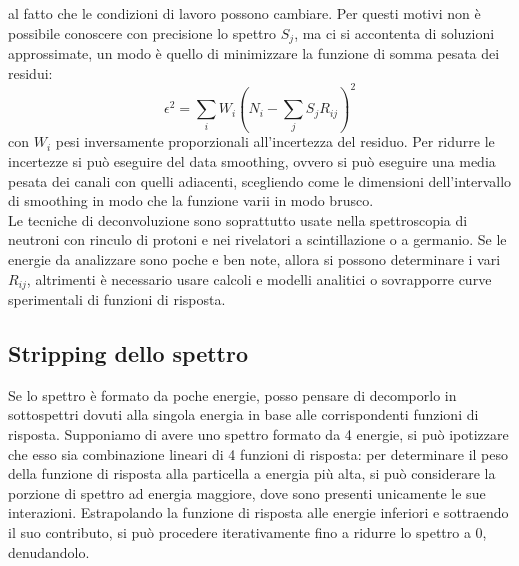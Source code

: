 al fatto che le condizioni di lavoro possono cambiare.
Per questi motivi non \`e possibile conoscere con precisione lo spettro $S_j$, ma ci si accontenta di soluzioni approssimate,
un modo \`e quello di minimizzare la funzione di somma pesata dei residui:
\begin{equation*}
\epsilon^2 = \sum_i W_i \left(N_i - \sum_j S_j R_{ij}\right)^2
\end{equation*}
con $W_i$ pesi inversamente proporzionali all'incertezza del residuo. 
Per ridurre le incertezze si pu\`o eseguire del data smoothing, ovvero si pu\`o eseguire una media pesata dei canali con quelli adiacenti, scegliendo
come le dimensioni dell'intervallo di smoothing in modo che la funzione varii in modo brusco.\\
Le tecniche di deconvoluzione sono soprattutto usate nella spettroscopia di neutroni con rinculo di protoni e nei rivelatori a scintillazione o a germanio.
Se le energie da analizzare sono poche e ben note, allora si possono determinare i vari $R_{ij}$, altrimenti \`e necessario
usare calcoli e modelli analitici o sovrapporre curve sperimentali di funzioni di risposta.
\subsection{Stripping dello spettro}
Se lo spettro \`e formato da poche energie, posso pensare di decomporlo in sottospettri dovuti alla singola energia in base alle corrispondenti funzioni di risposta.
Supponiamo di avere uno spettro formato da 4 energie, si pu\`o ipotizzare che esso sia combinazione lineari di 4 funzioni di risposta:
per determinare il peso della funzione di risposta alla particella a energia pi\`u alta, si pu\`o considerare la porzione di spettro ad energia
maggiore, dove sono presenti unicamente le sue interazioni.
Estrapolando la funzione di risposta alle energie inferiori e sottraendo il suo contributo, si pu\`o procedere iterativamente fino a ridurre lo spettro
a 0, denudandolo.
